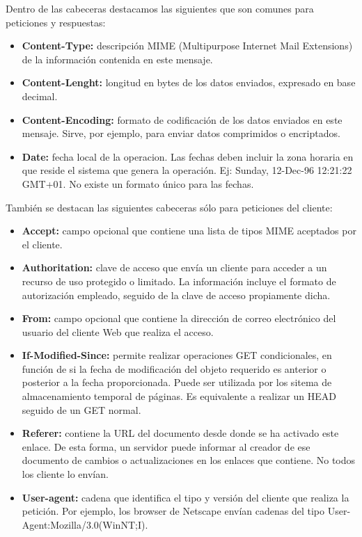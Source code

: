 \documentclass[a4paper,11pt]{article}
\begin{document}
Dentro de las cabeceras destacamos las siguientes que son comunes para peticiones y respuestas:

\begin{itemize}
\item \textbf{Content-Type:} descripción MIME (Multipurpose Internet Mail Extensions) de la información contenida en este mensaje.

\item \textbf{Content-Lenght:} longitud en bytes de los datos enviados, expresado en base decimal.

\item \textbf{Content-Encoding:} formato de codificación de los datos enviados en este mensaje. Sirve, por ejemplo, para enviar datos comprimidos o encriptados.

\item \textbf{Date:} fecha local de la operacion. Las fechas deben incluir la zona horaria en que reside el sistema que genera la operación. Ej: Sunday, 12-Dec-96 12:21:22 GMT+01. No existe un formato único para las fechas.
\end{itemize}

También se destacan las siguientes cabeceras sólo para peticiones del cliente:

\begin{itemize}
\item \textbf{Accept:} campo opcional que contiene una lista de tipos MIME aceptados por el cliente.

\item \textbf{Authoritation:} clave de acceso que envía un cliente para acceder a un recurso de uso protegido o limitado. La información incluye el formato de autorización empleado, seguido de la clave de acceso propiamente dicha.

\item \textbf{From:} campo opcional que contiene la dirección de correo electrónico del usuario del cliente Web que realiza el acceso.

\item \textbf{If-Modified-Since:} permite realizar operaciones GET condicionales, en función de si la fecha de modificación del objeto requerido es anterior o posterior a la fecha proporcionada. Puede ser utilizada por los sitema de almacenamiento temporal de páginas. Es equivalente a realizar un HEAD seguido de un GET normal.

\item \textbf{Referer:} contiene la URL del documento desde donde se ha activado este enlace. De esta forma, un servidor puede informar al creador de ese documento de cambios o actualizaciones en los enlaces que contiene. No todos los cliente lo envían.

\item \textbf{User-agent:} cadena que identifica el tipo y versión del cliente que realiza la petición. Por ejemplo, los browser de Netscape envían cadenas del tipo User-Agent:Mozilla/3.0(WinNT;I).
\end{itemize}
\end{document}
